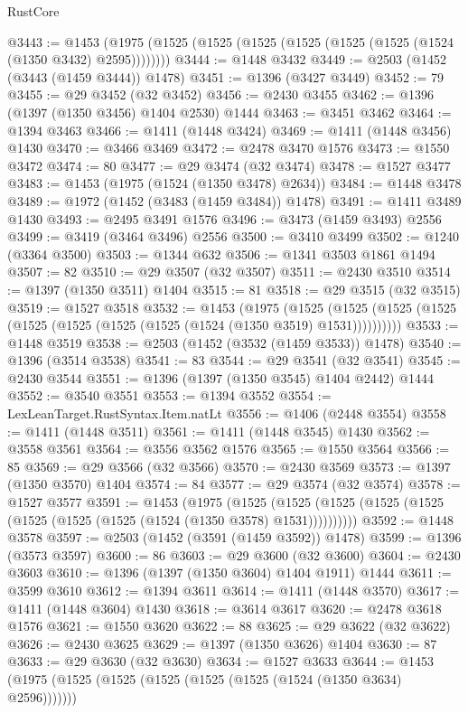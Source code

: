 \begin{lexlean}{RustCore}
\begin{coremodule}
@3443 := @1453 (@1975 (@1525 (@1525 (@1525 (@1525 (@1525 (@1525 (@1524 (@1350 @3432) @2595))))))))
@3444 := @1448 @3432
@3449 := @2503 (@1452 (@3443 (@1459 @3444)) @1478)
@3451 := @1396 (@3427 @3449)
@3452 := 79
@3455 := @29 @3452 (@32 @3452)
@3456 := @2430 @3455
@3462 := @1396 (@1397 (@1350 @3456) @1404 @2530) @1444
@3463 := @3451 @3462
@3464 := @1394 @3463
@3466 := @1411 (@1448 @3424)
@3469 := @1411 (@1448 @3456) @1430
@3470 := @3466 @3469
@3472 := @2478 @3470 @1576
@3473 := @1550 @3472
@3474 := 80
@3477 := @29 @3474 (@32 @3474)
@3478 := @1527 @3477
@3483 := @1453 (@1975 (@1524 (@1350 @3478) @2634))
@3484 := @1448 @3478
@3489 := @1972 (@1452 (@3483 (@1459 @3484)) @1478)
@3491 := @1411 @3489 @1430
@3493 := @2495 @3491 @1576
@3496 := @3473 (@1459 @3493) @2556
@3499 := @3419 (@3464 @3496) @2556
@3500 := @3410 @3499
@3502 := @1240 (@3364 @3500)
@3503 := @1344 @632
@3506 := @1341 @3503 @1861 @1494
@3507 := 82
@3510 := @29 @3507 (@32 @3507)
@3511 := @2430 @3510
@3514 := @1397 (@1350 @3511) @1404
@3515 := 81
@3518 := @29 @3515 (@32 @3515)
@3519 := @1527 @3518
@3532 := @1453
    (@1975
      (@1525 (@1525 (@1525 (@1525 (@1525 (@1525 (@1525 (@1525 (@1524 (@1350 @3519) @1531))))))))))
@3533 := @1448 @3519
@3538 := @2503 (@1452 (@3532 (@1459 @3533)) @1478)
@3540 := @1396 (@3514 @3538)
@3541 := 83
@3544 := @29 @3541 (@32 @3541)
@3545 := @2430 @3544
@3551 := @1396 (@1397 (@1350 @3545) @1404 @2442) @1444
@3552 := @3540 @3551
@3553 := @1394 @3552
@3554 := LexLeanTarget.RustSyntax.Item.natLt
@3556 := @1406 (@2448 @3554)
@3558 := @1411 (@1448 @3511)
@3561 := @1411 (@1448 @3545) @1430
@3562 := @3558 @3561
@3564 := @3556 @3562 @1576
@3565 := @1550 @3564
@3566 := 85
@3569 := @29 @3566 (@32 @3566)
@3570 := @2430 @3569
@3573 := @1397 (@1350 @3570) @1404
@3574 := 84
@3577 := @29 @3574 (@32 @3574)
@3578 := @1527 @3577
@3591 := @1453
    (@1975
      (@1525 (@1525 (@1525 (@1525 (@1525 (@1525 (@1525 (@1525 (@1524 (@1350 @3578) @1531))))))))))
@3592 := @1448 @3578
@3597 := @2503 (@1452 (@3591 (@1459 @3592)) @1478)
@3599 := @1396 (@3573 @3597)
@3600 := 86
@3603 := @29 @3600 (@32 @3600)
@3604 := @2430 @3603
@3610 := @1396 (@1397 (@1350 @3604) @1404 @1911) @1444
@3611 := @3599 @3610
@3612 := @1394 @3611
@3614 := @1411 (@1448 @3570)
@3617 := @1411 (@1448 @3604) @1430
@3618 := @3614 @3617
@3620 := @2478 @3618 @1576
@3621 := @1550 @3620
@3622 := 88
@3625 := @29 @3622 (@32 @3622)
@3626 := @2430 @3625
@3629 := @1397 (@1350 @3626) @1404
@3630 := 87
@3633 := @29 @3630 (@32 @3630)
@3634 := @1527 @3633
@3644 := @1453 (@1975 (@1525 (@1525 (@1525 (@1525 (@1525 (@1524 (@1350 @3634) @2596)))))))

\end{coremodule}
\end{lexlean}
